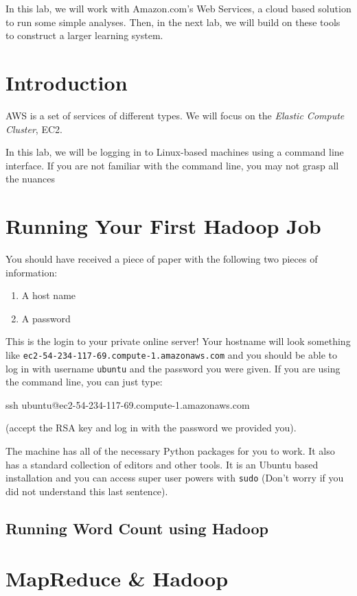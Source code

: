 In this lab, we will work with Amazon.com's Web Services, a cloud based solution
to run some simple analyses. Then, in the next lab, we will build on these
tools to construct a larger learning system.

\section{Introduction}

AWS is a set of services of different types. We will focus on the \emph{Elastic
Compute Cluster}, EC2.


In this lab, we will be logging in to Linux-based machines using a command line
interface. If you are not familiar with the command line, you may not grasp all
the nuances

\section{Running Your First Hadoop Job}

You should have received a piece of paper with the following two pieces of
information:

\begin{enumerate}
\item A host name
\item A password
\end{enumerate}

This is the login to your private online server! Your hostname will look
something like \texttt{ec2-54-234-117-69.compute-1.amazonaws.com} and you
should be able to log in with username \texttt{ubuntu} and the password you
were given. If you are using the command line, you can just type:

ssh ubuntu@ec2-54-234-117-69.compute-1.amazonaws.com

(accept the RSA key and log in with the password we provided you).

The machine has all of the necessary Python packages for you to work. It also
has a standard collection of editors and other tools. It is an Ubuntu based
installation and you can access super user powers with \texttt{sudo} (Don't
worry if you did not understand this last sentence).

\subsection{Running Word Count using Hadoop}

\section{MapReduce \& Hadoop}

